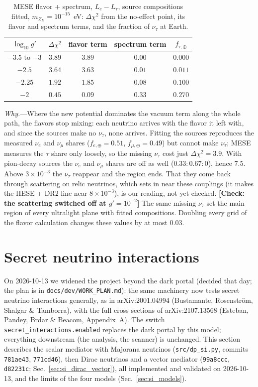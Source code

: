 \documentclass[11pt,a4paper]{article}
\newcommand{\note}[1]{\textbf{[#1]}}
\newcommand{\file}[1]{\nolinkurl{#1}}
\newcommand{\mzd}{m_{Z_D}}
\begin{document}
\begin{table}[h]
\centering
\begin{tabular}{ccccc}
$\log_{10} g'$ & $\Delta\chi^2$ & flavor term & spectrum term & $f_{\tau,\oplus}$ \\ \hline
$-3.5$ to $-3$ & $3.89$ & $3.89$ & $0.00$ & $0.000$ \\
$-2.5$ & $3.64$ & $3.63$ & $0.01$ & $0.011$ \\
$-2.25$ & $1.92$ & $1.85$ & $0.08$ & $0.100$ \\
$-2$ & $0.45$ & $0.09$ & $0.33$ & $0.270$
\end{tabular}
\caption{MESE flavor + spectrum, $L_e - L_\tau$, source compositions fitted, $\mzd = 10^{-15}$~eV: $\Delta\chi^2$ from
the no-effect point, its flavor and spectrum terms, and the fraction of $\nu_\tau$ at Earth.}
\label{tab:tau_disappearance}
\end{table}

\textit{Why.}---Where the new potential dominates the vacuum term along the whole path, the flavors stop mixing: each
neutrino arrives with the flavor it left with, and since the sources make no $\nu_\tau$, none arrives. Fitting the
sources reproduces the measured $\nu_e$ and $\nu_\mu$ shares ($f_{e,\oplus} = 0.51$, $f_{\mu,\oplus} = 0.49$) but cannot
make $\nu_\tau$; MESE measures the $\tau$ share only loosely, so the missing $\nu_\tau$ cost just $\Delta\chi^2 = 3.9$.
With pion-decay sources the $\nu_e$ and $\nu_\mu$ shares are off as well ($0.33{:}0.67{:}0$), hence $7.5$. Above
$3\times10^{-3}$ the $\nu_\tau$ reappear and the region ends. That they come back through scattering on relic
neutrinos, which sets in near these couplings (it makes the HESE + DR2 line near $8\times10^{-3}$), is our reading,
not yet checked. \note{Check: the scattering switched off at $g' = 10^{-2}$} The same missing $\nu_\tau$ set the main
region of every ultralight plane with fitted compositions. Doubling every grid of the flavor calculation changes these
values by at most $0.03$.

\section{Secret neutrino interactions}
\label{sec:si}

On 2026-10-13 we widened the project beyond the dark portal (decided that day; the plan is in
\file{docs/dev/WORK_PLAN.md}): the same machinery now tests secret neutrino interactions
generally, as in arXiv:2001.04994 (Bustamante, Rosenstr\"om, Shalgar \& Tamborra), with the full
cross sections of arXiv:2107.13568 (Esteban, Pandey, Brdar \& Beacom, Appendix~A). The switch
\texttt{secret\_interactions.enabled} replaces the dark portal by this model; everything
downstream (the analysis, the scanner) is unchanged. This section describes the scalar mediator
with Majorana neutrinos (\file{src/dp_si.py}, commits \texttt{781ae43}, \texttt{771cd46}), then
Dirac neutrinos and a vector mediator (\texttt{99a8ccc}, \texttt{d82231c};
Sec.~\ref{sec:si_dirac_vector}), all implemented and validated on 2026-10-13, and the limits of the
four models (Sec.~\ref{sec:si_models}).
\end{document}
